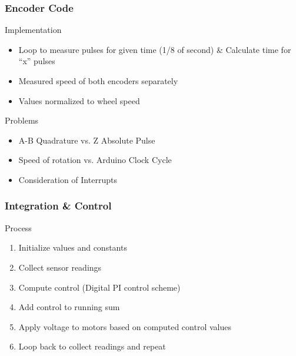 \documentclass{beamer}
\begin{document}
\begin{frame}
	\frametitle{Encoder Code}
		\begin{block}{Implementation}
			\begin{itemize}
				\item Loop to measure pulses for given time (1/8 of second) \& Calculate time for “x” pulses
				\item Measured speed of both encoders separately
				\item Values normalized to wheel speed
			\end{itemize}
		\end{block}
		\begin{block}{Problems}
			\begin{itemize}
				\item A-B Quadrature vs. Z Absolute Pulse
				\item Speed of rotation vs. Arduino Clock Cycle
				\item Consideration of Interrupts	
			\end{itemize}
		\end{block}	
\end{frame}
\begin{frame}
	\frametitle{Integration \& Control}
		\begin{block}{Process}
			\begin{enumerate}
				\item Initialize values and constants
				\item Collect sensor readings
				\item Compute control (Digital PI control scheme)
				\item Add control to running sum
				\item Apply voltage to motors based on computed control values
				\item Loop back to collect readings and repeat
			\end{enumerate}
		\end{block}
\end{frame}
\end{document}
